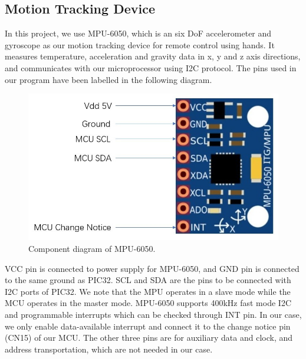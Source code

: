 \documentclass[a4paper]{article}
\begin{document}
\subsection{Motion Tracking Device}
In this project, we use MPU-6050, which is an six DoF accelerometer and gyroscope as our motion tracking device for remote control using hands. It measures temperature, acceleration and gravity data in x, y and z axis directions, and communicates with our microprocessor using I2C protocol. The pins used in our program have been labelled in the following diagram.
\begin{figure}[H]
    \centering
    \includegraphics[width=1\textwidth]{MPU.jpg}
    \caption{Component diagram of MPU-6050.}
\end{figure}
VCC pin is connected to power supply for MPU-6050, and GND pin is connected to the same ground as PIC32. SCL and SDA are the pins to be connected with I2C ports of PIC32. We note that the MPU operates in a slave mode while the MCU operates in the master mode. MPU-6050 supports 400kHz fast mode I2C and programmable interrupts which can be checked through INT pin. In our case, we only enable data-available interrupt and connect it to the change notice pin (CN15) of our MCU. The other three pins are for auxiliary data and clock, and address transportation, which are not needed in our case.
\end{document}
